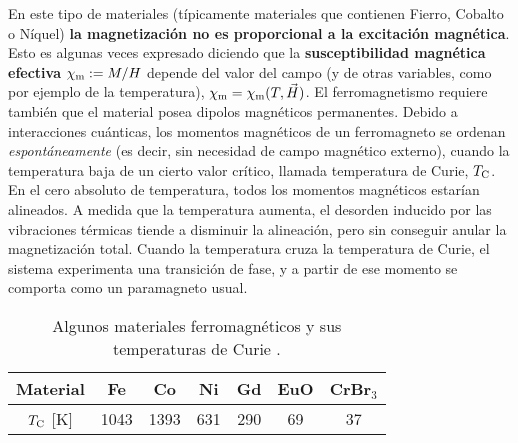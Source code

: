  En este tipo de materiales (típicamente materiales que
contienen Fierro, Cobalto o Níquel) \textbf{la magnetización no es
proporcional a la excitación magnética}. Esto es algunas veces expresado
diciendo que la \textbf{susceptibilidad magnética efectiva} $\chi_{\rm m}:=M/H$ depende del valor del campo (y de otras variables, como por ejemplo de la temperatura), $\chi_{\rm m}=\chi_{\rm m}(T,\vec{H})$. El ferromagnetismo
requiere también que el material posea dipolos magnéticos permanentes. Debido
a interacciones cuánticas, los momentos magnéticos de un ferromagneto se
ordenan \textit{espontáneamente} (es decir, sin necesidad de campo magnético
externo), cuando la temperatura baja de un cierto valor crítico, llamada
temperatura de Curie, $T_{\rm C}$. En el cero absoluto de temperatura, todos los
momentos magnéticos estarían alineados. A medida que la temperatura aumenta, el
desorden inducido por las vibraciones térmicas tiende a disminuir la
alineación, pero sin conseguir
anular la magnetización total. Cuando la temperatura cruza la temperatura de
Curie, el sistema experimenta una transición de fase, y a partir de ese
momento se comporta como un paramagneto usual.
\begin{table}[h!]
\begin{center}
\begin{tabular}{c||c|c|c|c|c|c}
Material & Fe & Co & Ni & Gd & EuO & CrBr${}_3$  \\ \hline
$T_{\rm C}$ [K] & 1043 & 1393 & 631 & 290 & 69 & 37
\end{tabular}
\caption{Algunos materiales ferromagnéticos y sus temperaturas de Curie 
\cite{Nolting}.}
\end{center}
\end{table}

